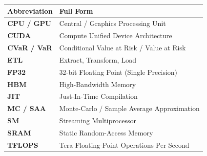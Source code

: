 \vspace{-0.5em}
\begin{longtable}{@{} >{\bfseries}l l @{}}
\toprule
\textbf{Abbreviation} & \textbf{Full Form} \\
\midrule
\endhead
CPU / GPU  & Central / Graphics Processing Unit \\
CUDA       & Compute Unified Device Architecture \\
CVaR / VaR & Conditional Value at Risk / Value at Risk \\
ETL        & Extract, Transform, Load \\
FP32       & 32-bit Floating Point (Single Precision) \\
HBM        & High-Bandwidth Memory \\
JIT        & Just-In-Time Compilation \\
MC / SAA   & Monte-Carlo / Sample Average Approximation \\
SM         & Streaming Multiprocessor \\
SRAM       & Static Random-Access Memory \\
TFLOPS     & Tera Floating-Point Operations Per Second \\
\bottomrule
\end{longtable}
